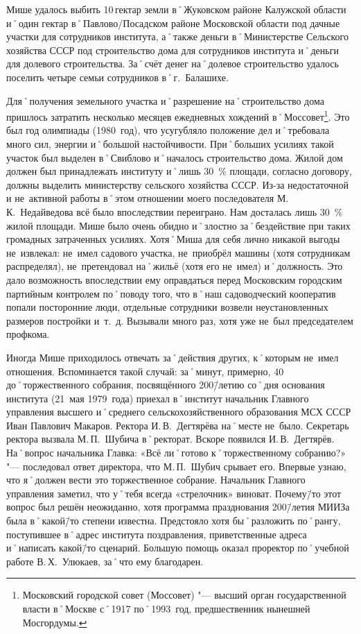 Мише удалось выбить 10\,гектар земли в˚Жуковском районе Калужской области и˚один гектар в˚Павлово\-/Посадском районе Московской области под дачные участки для сотрудников института, а˚также деньги в˚Министерстве Сельского хозяйства СССР под строительство дома для сотрудников института и˚деньги для долевого строительства. За˚счёт денег на˚долевое строительство удалось поселить четыре семьи сотрудников в˚г.~Балашихе.

Для˚получения земельного участка и˚разрешение на˚строительство дома пришлось затратить несколько месяцев ежедневных хождений в˚Моссовет\footnote{Московский городской совет (Моссовет) "--- высший орган государственной власти в˚Москве с˚1917 по˚1993~год, предшественник нынешней Мосгордумы.}. Это был год олимпиады (1980~год), что усугубляло положение дел и˚требовала много сил, энергии и˚большой настойчивости. При˚больших усилиях такой участок был выделен в˚Свиблово и˚началось строительство дома. Жилой дом должен был принадлежать институту и˚лишь 30~\% площади, согласно договору, должны выделить министерству сельского хозяйства СССР. Из-за недостаточной и не~активной работы в˚этом отношении моего последователя М.\,К.~Недайведова всё было впоследствии переиграно. Нам досталась лишь 30~\% жилой площади. Мише было очень обидно и˚злостно за˚бездействие при таких громадных затраченных усилиях. Хотя˚Миша для себя лично никакой выгоды не~извлекал: не~имел садового участка, не~приобрёл машины (хотя сотрудникам распределял), не~претендовал на˚жильё (хотя его не~имел) и˚должность. Это дало возможность впоследствии ему оправдаться перед Московским городским партийным контролем по˚поводу того, что в˚наш садоводческий кооператив попали посторонние люди, отдельные сотрудники возвели неустановленных размеров постройки и~т.~д. Вызывали много раз, хотя уже не~был председателем профкома.

Иногда Мише приходилось отвечать за˚действия других, к˚которым не~имел отношения. Вспоминается такой случай: за˚минут, примерно, 40 до˚торжественного собрания, посвящённого 200\=/летию со˚дня основания института (21~мая 1979~года) приехал в˚институт начальник Главного управления высшего и˚среднего сельскохозяйственного образования МСХ СССР Иван Павлович Макаров. Ректора И.\,В.~Дегтярёва на˚месте не~было. Секретарь ректора вызвала М.\,П.~Шубича в˚ректорат. Вскоре появился И.\,В.~Дегтярёв. На˚вопрос начальника Главка: «Всё ли˚готово к˚торжественному собранию?» "--- последовал ответ директора, что М.\,П.~Шубич срывает его. Впервые узнаю, что я˚должен вести это торжественное собрание. Начальник Главного управления заметил, что у˚тебя всегда «стрелочник» виноват. Почему\=/то этот вопрос был решён неожиданно, хотя программа празднования 200\=/летия МИИЗа была в˚какой\=/то степени известна. Предстояло хотя бы˚разложить по˚рангу, поступившее в˚адрес института поздравления, приветственные адреса и˚написать какой\=/то сценарий. Большую помощь оказал проректор по˚учебной работе В.\,Х.~Улюкаев, за˚что ему благодарен.

